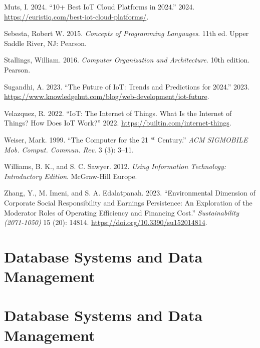 \documentclass[
  letterpaper,
  DIV=11,
  numbers=noendperiod]{scrreprt}
\newlength{\cslhangindent}
\newenvironment{CSLReferences}[2] %
 {\begin{list}{}{%
  \setlength{\itemindent}{0pt}
  \setlength{\leftmargin}{0pt}
  \setlength{\parsep}{0pt}
  \ifodd #1
   \setlength{\leftmargin}{\cslhangindent}
   \setlength{\itemindent}{-1\cslhangindent}
  \fi
  \setlength{\itemsep}{#2\baselineskip}}}
 {\end{list}}
\begin{document}
\begin{CSLReferences}{1}{0}
Muts, I. 2024. {``10+ Best IoT Cloud Platforms in 2024.''} 2024.
\url{https://euristiq.com/best-iot-cloud-platforms/}.

Sebesta, Robert W. 2015. \emph{Concepts of Programming Languages}. 11th
ed. Upper Saddle River, NJ: Pearson.

Stallings, William. 2016. \emph{Computer Organization and Architecture}.
10th edition. Pearson.

Sugandhi, A. 2023. {``The Future of IoT: Trends and Predictions for
2024.''} 2023.
\url{https://www.knowledgehut.com/blog/web-development/iot-future}.

Velazquez, R. 2022. {``IoT: The Internet of Things. What Is the Internet
of Things? How Does IoT Work?''} 2022.
\url{https://builtin.com/internet-things}.

Weiser, Mark. 1999. {``The Computer for the 21 \(^{st}\) Century.''}
\emph{ACM SIGMOBILE Mob. Comput. Commun. Rev.} 3 (3): 3--11.

Williams, B. K., and S. C. Sawyer. 2012. \emph{Using Information
Technology: Introductory Edition}. McGraw-Hill Europe.

Zhang, Y., M. Imeni, and S. A. Edalatpanah. 2023. {``Environmental
Dimension of Corporate Social Responsibility and Earnings Persistence:
An Exploration of the Moderator Roles of Operating Efficiency and
Financing Cost.''} \emph{Sustainability (2071-1050)} 15 (20): 14814.
\url{https://doi.org/10.3390/su152014814}.

\end{CSLReferences}


\chapter{Database Systems and Data
Management}\label{database-systems-and-data-management}


\chapter{Database Systems and Data
Management}\label{database-systems-and-data-management-1}
\end{document}
